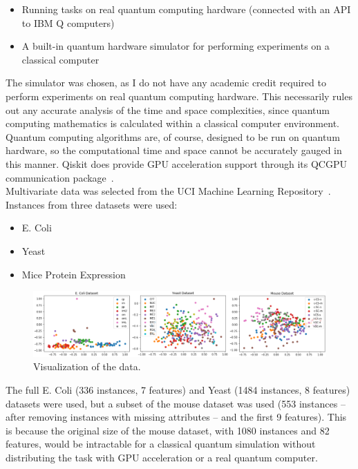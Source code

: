 \documentclass{article}
\begin{document}
    \begin{itemize}
      \item{Running tasks on real quantum computing hardware (connected with an API to IBM Q computers)}
      \item{A built-in quantum hardware simulator for performing experiments on a classical computer}
    \end{itemize}

  The simulator was chosen, as I do not have any academic credit required to perform experiments on real quantum computing hardware. This necessarily rules out any accurate analysis of the time and space complexities, since quantum computing mathematics is calculated within a classical computer environment. Quantum computing algorithms are, of course, designed to be run on quantum hardware, so the computational time and space cannot be accurately gauged in this manner. Qiskit does provide GPU acceleration support through its QCGPU communication package~\cite{qcgpu}. \\

  Multivariate data was selected from the UCI Machine Learning Repository~\cite{uci}. Instances from three datasets were used:

    \begin{itemize}
      \item E. Coli~\cite{ecoli}
      \item Yeast~\cite{yeast}
      \item Mice Protein Expression~\cite{mouse}
    \end{itemize}

    \begin{figure}[h]
      \centering
      \includegraphics[width=1\textwidth]{data.png}
      \caption{\label{fig:data}Visualization of the data.}
    \end{figure}


  The full E. Coli (336 instances, 7 features) and Yeast (1484 instances, 8 features) datasets were used, but a subset of the mouse dataset was used (553 instances -- after removing instances with missing attributes -- and the first 9 features). This is because the original size of the mouse dataset, with 1080 instances and 82 features, would be intractable for a classical quantum simulation without distributing the task with GPU acceleration or a real quantum computer. \\
\end{document}

